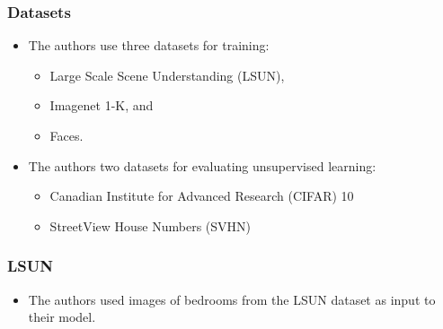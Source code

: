 \documentclass{beamer}
\begin{document}

\begin{frame}
\frametitle{Datasets}
\begin{itemize}
  \item The authors use three datasets for training:
  \begin{itemize}
    \item Large Scale Scene Understanding (LSUN),
    \item Imagenet 1-K, and
    \item Faces.
  \end{itemize}  
  \item The authors two datasets for evaluating unsupervised learning:
  \begin{itemize}
    \item Canadian Institute for Advanced Research (CIFAR) 10
    \item StreetView House Numbers (SVHN)
  \end{itemize}
\end{itemize}
\end{frame}


\begin{frame}
\frametitle{LSUN}
\begin{itemize}
 \item The authors used images of bedrooms from the LSUN dataset \cite{lsunDataset} as input to their model.
\end{itemize}
\end{frame}

\end{document}
